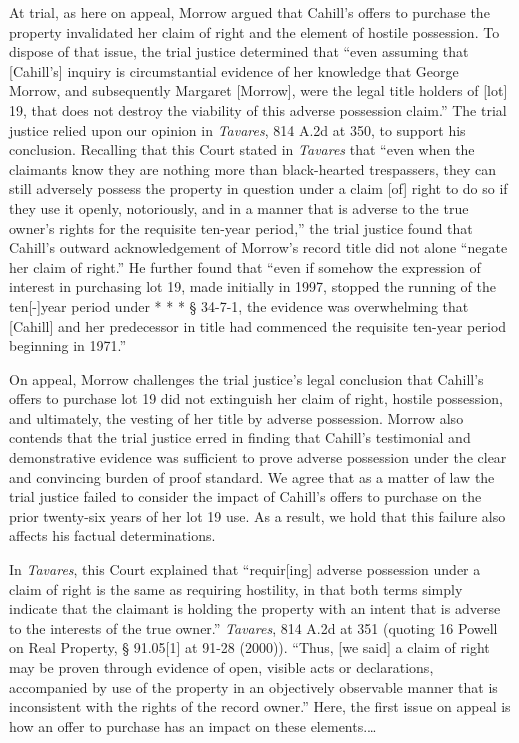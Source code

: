 At trial, as here on appeal, Morrow argued that Cahill's offers to purchase the
property invalidated her claim of right and the element of hostile possession.
To dispose of that issue, the trial justice determined that ``even assuming
that [Cahill's] inquiry is circumstantial evidence of her knowledge that George
Morrow, and subsequently Margaret [Morrow], were the legal title holders of
[lot] 19, that does not destroy the viability of this adverse possession
claim.'' The trial justice relied upon our opinion in \textit{Tavares}, 814
A.2d at 350, to support his conclusion. Recalling that this Court stated in
\textit{Tavares} that ``even when the claimants know they are nothing more than
black-hearted trespassers, they can still adversely possess the property in
question under a claim [of] right to do so if they use it openly, notoriously,
and in a manner that is adverse to the true owner's rights for the requisite
ten-year period,'' the trial justice found that Cahill's outward
acknowledgement of Morrow's record title did not alone ``negate her claim of
right.'' He further found that ``even if somehow the expression of interest in
purchasing lot 19, made initially in 1997, stopped the running of the
ten[-]year period under * * * {\S} 34-7-1, the evidence was overwhelming that
[Cahill] and her predecessor in title had commenced the requisite ten-year
period beginning in 1971.''


On appeal, Morrow challenges the trial justice's legal conclusion that Cahill's
offers to purchase lot 19 did not extinguish her claim of right, hostile
possession, and ultimately, the vesting of her title by adverse possession.
Morrow also contends that the trial justice erred in finding that Cahill's
testimonial and demonstrative evidence was sufficient to prove adverse
possession under the clear and convincing burden of proof standard. We agree
that as a matter of law the trial justice failed to consider the impact of
Cahill's offers to purchase on the prior twenty-six years of her lot 19 use. As
a result, we hold that this failure also affects his factual determinations.


In \textit{Tavares}, this Court explained that ``requir[ing] adverse possession
under a claim of right is the same as requiring hostility, in that both terms
simply indicate that the claimant is holding the property with an intent that
is adverse to the interests of the true owner.'' \textit{Tavares}, 814 A.2d at
351 (quoting 16 Powell on Real Property, {\S} 91.05[1] at 91-28 (2000)).
``Thus, [we said] a claim of right may be proven through evidence of open,
visible acts or declarations, accompanied by use of the property in an
objectively observable manner that is inconsistent with the rights of the
record owner.'' Here, the first issue on appeal is how an offer to purchase has
an impact on these elements.\ldots


